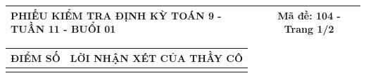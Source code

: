 \documentclass[12pt,a4paper]{article}
\begin{document}
\newpage
\noindent
\begin{tabularx}{\linewidth}{|X|c|}
\hline
\textbf{PHIẾU KIỂM TRA ĐỊNH KỲ TOÁN 9 - TUẦN 11 - BUỔI 01} & \textbf{Mã đề: 104 - Trang 1/2} \\
\hline
\end{tabularx}

\vspace{1.0mm}

\noindent
\begin{tabularx}{\linewidth}{|p{3.2cm}|X|}
\hline
\centering\textbf{ĐIỂM SỐ} & \centering\textbf{LỜI NHẬN XÉT CỦA THẦY CÔ} \tabularnewline
\hline
\rule{0pt}{1.8cm} & \tabularnewline
\hline
\end{tabularx}
\end{document}
